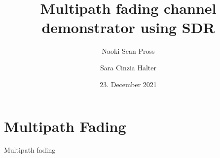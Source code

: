 \documentclass[xetex, onlymath, handout]{beamer}
\title{Multipath fading channel demonstrator using SDR}
\author{Naoki Sean Pross \and Sara Cinzia Halter}
\date{23. December 2021}
\institute[OST]{OST FHO Campus Rapperswil}
\begin{document}
\frame{
  \maketitle
}

\section{Multipath Fading}

\begin{frame}{Multipath fading}
  
\end{frame}
\end{document}
